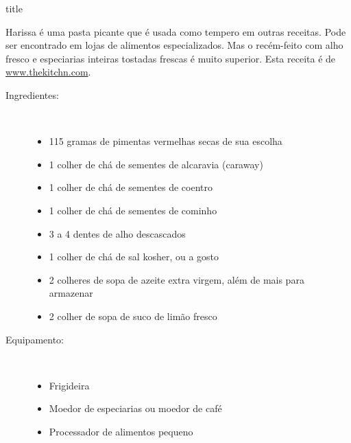 \documentclass [11pt, papel de carta] {article}
\begin{document}
 {title}

Harissa é uma pasta picante que é usada como tempero em outras receitas. Pode ser encontrado em lojas de alimentos especializados. Mas o recém-feito com alho fresco e especiarias inteiras tostadas frescas é muito superior. Esta receita é de \href {https://www.thekitchn.com/how-to-make-harissa-cooking-lessons-from-the-kitchn-190188} {www.thekitchn.com}.
\begin {description}

\item [Ingredientes:] \ \\
\begin {itemize}
\item 115 gramas de pimentas vermelhas secas de sua escolha
\item 1 colher de chá de sementes de alcaravia (caraway)
\item 1 colher de chá de sementes de coentro
\item 1 colher de chá de sementes de cominho
\item 3 a 4 dentes de alho descascados
\item 1 colher de chá de sal kosher, ou a gosto
\item 2 colheres de sopa de azeite extra virgem, além de mais para armazenar
\item 2 colher de sopa de suco de limão fresco
\end {itemize}

\item [Equipamento:] \ \\
\begin {itemize}
\item Frigideira
\item Moedor de especiarias ou moedor de café
\item Processador de alimentos pequeno
\end {itemize}



\end{description}
\end{document}
